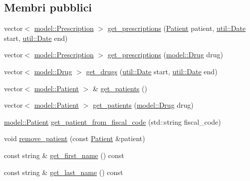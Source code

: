 \subsection*{Membri pubblici}
\begin{DoxyCompactItemize}
\item 
vector$<$ \hyperlink{classmm_1_1model_1_1_prescription}{model\+::\+Prescription} $>$ \hyperlink{classmm_1_1model_1_1_doctor_a16be876e8591688f3b34ca86441253a2}{get\+\_\+prescriptions} (\hyperlink{classmm_1_1model_1_1_patient}{Patient} patient, \hyperlink{structmm_1_1util_1_1_date}{util\+::\+Date} start, \hyperlink{structmm_1_1util_1_1_date}{util\+::\+Date} end)
\item 
vector$<$ \hyperlink{classmm_1_1model_1_1_prescription}{model\+::\+Prescription} $>$ \hyperlink{classmm_1_1model_1_1_doctor_a76bf6b545709c7a784e4320b11f587bf}{get\+\_\+prescriptions} (\hyperlink{classmm_1_1model_1_1_drug}{model\+::\+Drug} drug)
\item 
vector$<$ \hyperlink{classmm_1_1model_1_1_drug}{model\+::\+Drug} $>$ \hyperlink{classmm_1_1model_1_1_doctor_ace64e6e74d0e39244c349fe5570ff974}{get\+\_\+drugs} (\hyperlink{structmm_1_1util_1_1_date}{util\+::\+Date} start, \hyperlink{structmm_1_1util_1_1_date}{util\+::\+Date} end)
\item 
vector$<$ \hyperlink{classmm_1_1model_1_1_patient}{model\+::\+Patient} $>$ \& \hyperlink{classmm_1_1model_1_1_doctor_a8b761c1dfbe10348eb99c0397e811e0a}{get\+\_\+patients} ()
\item 
vector$<$ \hyperlink{classmm_1_1model_1_1_patient}{model\+::\+Patient} $>$ \hyperlink{classmm_1_1model_1_1_doctor_a989fbde1a8784d8139d8add9066ab9b1}{get\+\_\+patients} (\hyperlink{classmm_1_1model_1_1_drug}{model\+::\+Drug} drug)
\item 
\hyperlink{classmm_1_1model_1_1_patient}{model\+::\+Patient} \hyperlink{classmm_1_1model_1_1_doctor_a89aa97cb00bfa2352c2a4f276554e738}{get\+\_\+patient\+\_\+from\+\_\+fiscal\+\_\+code} (std\+::string fiscal\+\_\+code)
\item 
void \hyperlink{classmm_1_1model_1_1_doctor_a1fe35e39d290992a5f6f4a73d4fa8d50}{remove\+\_\+patient} (const \hyperlink{classmm_1_1model_1_1_patient}{Patient} \&patient)
\item 
const string \& \hyperlink{classmm_1_1model_1_1_doctor_ac33c8e6a13054d0c7aea1cf6aec4368f}{get\+\_\+first\+\_\+name} () const
\item 
const string \& \hyperlink{classmm_1_1model_1_1_doctor_a86a186641c22223ecb9951112befa3e9}{get\+\_\+last\+\_\+name} () const

\end{DoxyCompactItemize}
